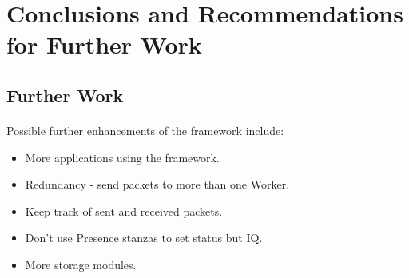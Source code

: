 \section{Conclusions and Recommendations for Further Work}
\paragraph{}



\subsection{Further Work}
\paragraph{}
Possible further enhancements of the framework include:
\begin{itemize}
\item More applications using the framework.
\item Redundancy - send packets to more than one Worker.
\item Keep track of sent and received packets.
\item Don't use Presence stanzas to set status but IQ.
\item More storage modules.
\end{itemize}

